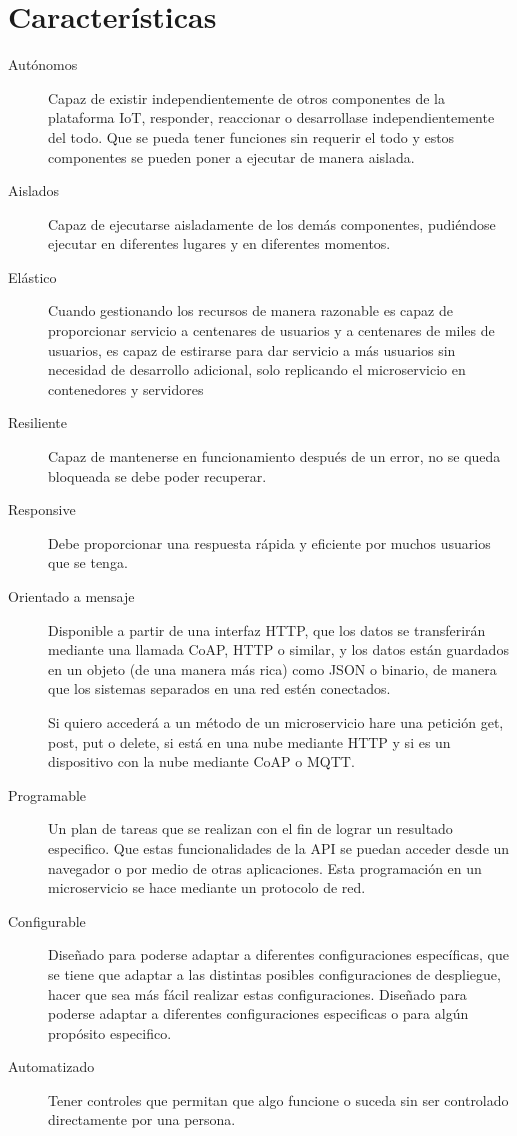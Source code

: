 \documentclass[12pt]{report} %
\begin{document}
\section{Características}
	\begin{description}
		\item[Autónomos] Capaz de existir independientemente de otros componentes de la plataforma IoT, responder, reaccionar o desarrollase independientemente del todo. Que se pueda tener funciones sin requerir el todo y estos componentes se pueden poner a ejecutar de manera aislada.
		\item[Aislados] Capaz de ejecutarse aisladamente de los demás componentes, pudiéndose ejecutar en diferentes lugares y en diferentes momentos.
		\item[Elástico] Cuando gestionando los recursos de manera razonable es capaz de proporcionar servicio a centenares de usuarios y a centenares de miles de usuarios, es capaz de estirarse para dar servicio a más usuarios sin necesidad de desarrollo adicional, solo replicando el microservicio en contenedores y servidores
		\item[Resiliente] Capaz de mantenerse en funcionamiento después de un error, no se queda bloqueada se debe poder recuperar.
		\item[Responsive] Debe proporcionar una respuesta rápida y eficiente por muchos usuarios que se tenga.
		\item[Orientado a mensaje] Disponible a partir de una interfaz HTTP, que los datos se transferirán mediante una llamada CoAP, HTTP o similar, y los datos están guardados en un objeto (de una manera más rica) como JSON o binario, de manera que los sistemas separados en una red estén conectados.
		
		Si quiero accederá a un método de un microservicio hare una petición get, post, put o delete, si está en una nube mediante HTTP y si es un dispositivo con la nube mediante CoAP o MQTT.

		\item[Programable] Un plan de tareas que se realizan con el fin de lograr un resultado especifico. Que estas funcionalidades de la API se puedan acceder desde un navegador o por medio de otras aplicaciones. Esta programación en un microservicio se hace mediante un protocolo de red.
		\item[Configurable] Diseñado para poderse adaptar a diferentes configuraciones específicas, que se tiene que adaptar a las distintas posibles configuraciones de despliegue, hacer que sea más fácil realizar estas configuraciones. Diseñado para poderse adaptar a diferentes configuraciones especificas o para algún propósito especifico.
		\item[Automatizado] Tener controles que permitan que algo funcione o suceda sin ser controlado directamente por una persona.
	\end{description}
\end{document}
